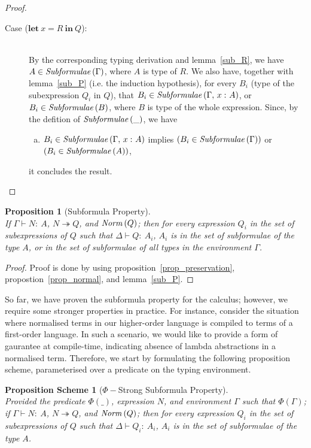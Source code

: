 \documentclass[a4paper]{article}
\newcommand{\typecolor}{}
\newcommand{\termcolor}{}
\newcommand{\tp}[1]{{\typecolor #1}}
\newcommand{\tm}[1]{{\termcolor #1}}
\newtheorem{proposition}[theorem]{Proposition}
\newtheorem{scheme}[theorem]{Proposition Scheme}
\newcommand{\expshr}[3]{\mathbf{let}\ #1\boldsymbol{=}#2\ \mathbf{in}\ #3}
\newcommand{\typing}[2]{\tm{#1:\ }\tp{#2}}
\newcommand{\typenvcon}[2]{\tp{\Gamma,}\ \typing{#1}{#2}}
\newcommand{\txt}[1]{\text{\textit{#1}}}
\newcommand{\reducestar}[3]{#1 \overset{#2}\twoheadrightarrow #3}
\newcommand{\subformulae}[1]{\txt{Subformulae}\,(#1)}
\newcommand{\norm}[1]{\txt{Norm}\,(#1)}
\begin{document}
\begin{proof}
\begin{description}
\item[Case ($\expshr{x}{R}{Q}$):]\ \\
  By the corresponding typing derivation and lemma~\ref{sub_R}, we
  have $A \in \subformulae{\Gamma}$, where $A$ is type of $R$. We also
  have, together with lemma~\ref{sub_P} (i.e. the induction
  hypothesis), for every $B_i$ (type of the subexpression $Q_i$ in
  $Q$), that $B_i \in \subformulae{\typenvcon{x}{A}}$, or $B_i \in
  \subformulae{B}$, where $B$ is type of the whole expression. Since, by the defition of $\subformulae{\_}$, we have
  \begin{enumerate}[(a)] 
     \item $B_i \in \subformulae{\typenvcon{x}{A}}$ implies $(B_i \in \subformulae{\Gamma})$ or $(B_i \in \subformulae{A})$,
  \end{enumerate}
  it concludes the result.
\end{description}
\end{proof}

\begin{proposition}[Subformula Property]\ \\
\label{prop_subformula}
If $\Gamma \vdash \typing{N}{A}$, $\reducestar{N}{}{Q}$, and $\norm{Q}$;
then for every expression $Q_i$ in the set of subexpressions of $Q$ such
that $\Delta \vdash \typing{Q}{A_i}$, $A_i$ is in the set of subformulae of
the type $A$, or in the set of subformulae of all types in the
environment $\Gamma$.
\end{proposition}
\begin{proof}
Proof is done by using proposition~\ref{prop_preservation},
propostion~\ref{prop_normal}, and lemma~\ref{sub_P}.
\end{proof}

So far, we have proven the subformula property for the calculus;
however, we require some stronger properties in practice. For
instance, consider the situation where normalised terms in our
higher-order language is compiled to terms of a first-order
language. In such a scenario, we would like to provide a form of
gaurantee at compile-time, indicating absence of lambda abstractions
in a normalised term. Therefore, we start by formulating the following
proposition scheme, parameterised over a predicate on the typing
environment.

\begin{scheme}[$\Phi-$Strong Subformula Property]\ \\
\label{sub_scheme}
Provided the predicate $\Phi(\_)$, expression $N$, and environment
$\Gamma$ such that $\Phi(\Gamma)$; if $\Gamma \vdash \typing{N}{A}$,
$\reducestar{N}{}{Q}$, and $\norm{Q}$; then for every expression $Q_i$
in the set of subexpressions of $Q$ such that $\Delta \vdash
\typing{Q_i}{A_i}$, $A_i$ is in the set of subformulae of the type
$A$.
\end{scheme}
\end{document}
